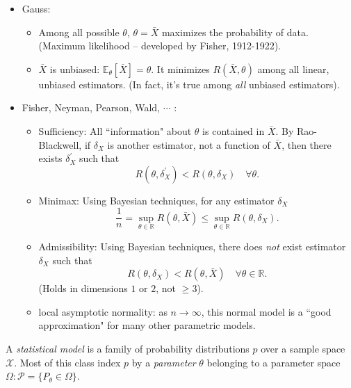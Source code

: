 \documentclass[a4paper]{article}
\begin{document}
\begin{answer*}
	\quad 
	\begin{itemize}
		\item Gauss: 
		\begin{itemize}
			\item Among all possible $\theta$, $\theta = \bar{X}$ maximizes the probability of data. (Maximum likelihood -- developed by Fisher, 1912-1922). 
			\item $\bar{X}$ is unbiased: $\mathbb{E}_{\theta}[\bar{X}] = \theta$. It minimizes $R(\bar{X},\theta)$ among all linear, unbiased estimators. (In fact, it's true among \emph{all} unbiased estimators).
		\end{itemize}
		\newpage
		\item Fisher, Neyman, Pearson, Wald, $\cdots$ : 
		\begin{itemize}
			\item Sufficiency: All ``information" about $\theta$ is contained in $\bar{X}$. By Rao-Blackwell, if $\delta_X$ is another estimator, not a function of $\bar{X}$, then there exists $\delta_X^{'}$ such that
			\begin{equation*}
				R(\theta,\delta_X^{'}) < R(\theta,\delta_X) \quad \forall \theta.
			\end{equation*}
			\item Minimax: Using Bayesian techniques, for any estimator $\delta_X$
			\begin{equation*}
				\frac{1}{n} = \sup_{\theta \in \mathbb{R}} R(\theta,\bar{X}) \leq \sup_{\theta \in \mathbb{R}} R(\theta,\delta_X).
			\end{equation*}
			\item Admissibility: Using Bayesian techniques, there does \emph{not} exist estimator $\delta_X$ such that
			\begin{equation*}
				R(\theta,\delta_X) < R(\theta,\bar{X}) \quad \forall \theta \in \mathbb{R}.
			\end{equation*}
			(Holds in dimensions $1$ or $2$, not $\geq 3$).
			\item local asymptotic normality: as $n \to \infty$, this normal model is a ``good approximation" for many other parametric models.
		\end{itemize}
	\end{itemize}
\end{answer*}

\begin{defi*}
	A \emph{statistical model} is a family of probability distributions $p$ over a sample space $\mathcal{X}$. Most of this class index $p$ by a \emph{parameter} $\theta$ belonging to a parameter space $\Omega: \mathcal{P} = \{P_{\theta} \in \Omega \}$.
\end{defi*}
\end{document}

